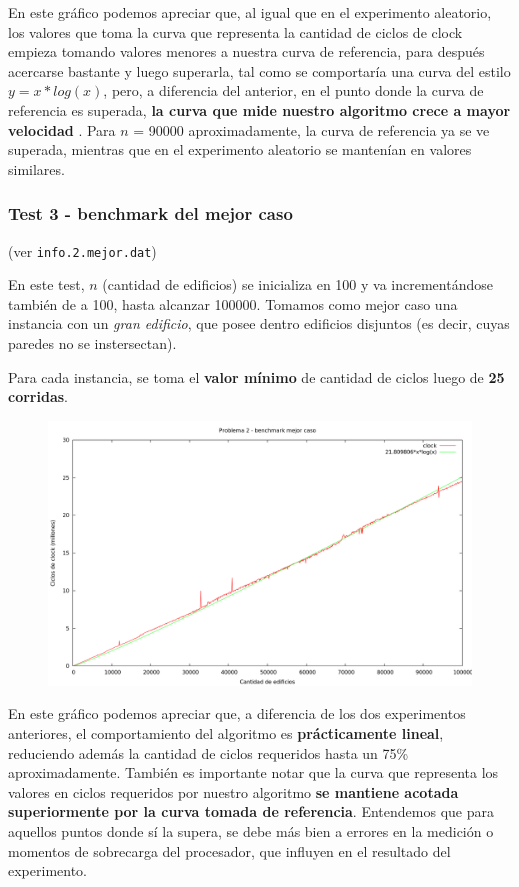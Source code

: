 \vspace*{0.5cm}

En este gráfico podemos apreciar que, al igual que en el experimento aleatorio, los valores que toma la curva
que representa la cantidad de ciclos de clock empieza tomando valores menores a nuestra curva de referencia,
para después acercarse bastante y luego superarla, tal como se comportaría una curva del estilo $y = x*log(x)$,
pero, a diferencia del anterior, en el punto donde la curva de referencia es superada, \textbf{la curva que mide nuestro
algoritmo crece a mayor velocidad} . Para $n$ = 90000 aproximadamente, la curva de referencia ya se ve superada,
mientras que en el experimento aleatorio se mantenían en valores similares.


\newpage


\subsubsection{Test 3 - benchmark del mejor caso}

(ver \verb|info.2.mejor.dat|) \medskip

En este test, $n$ (cantidad de edificios) se inicializa en 100 y va incrementándose también de a 100,
hasta alcanzar 100000. Tomamos como mejor caso una instancia con un \textit{gran edificio}, que posee dentro
edificios disjuntos (es decir, cuyas paredes no se instersectan).

Para cada instancia, se toma el \textbf{valor mínimo} de cantidad de ciclos luego de \textbf{25 corridas}.


\begin{figure}[h]
  \begin{center}
    \includegraphics[scale=0.35]{imagenes/grafico-2-mejor.png}
  \end{center}
\end{figure}


En este gráfico podemos apreciar que, a diferencia de los dos experimentos anteriores, el comportamiento
del algoritmo es \textbf{prácticamente lineal}, reduciendo además la cantidad de ciclos requeridos hasta un 75\%
aproximadamente. También es importante notar que la curva que representa los valores en ciclos requeridos
por nuestro algoritmo \textbf{se mantiene acotada superiormente por la curva tomada de referencia}. Entendemos que
para aquellos puntos donde sí la supera, se debe más bien a errores en la medición o momentos de sobrecarga
del procesador, que influyen en el resultado del experimento.
